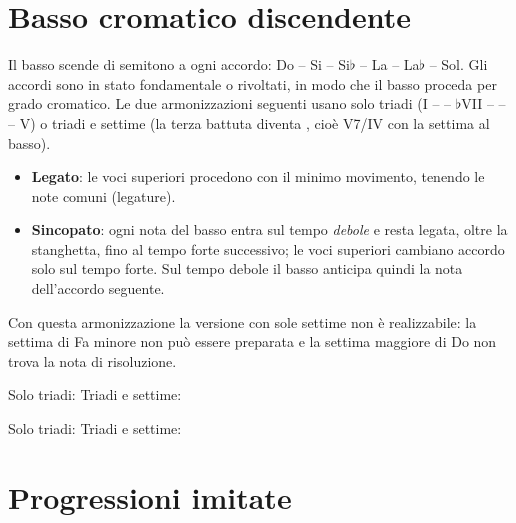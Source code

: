 \section{Basso cromatico discendente}
\label{sec:basso_cromatico_disc}

Il basso scende di semitono a ogni accordo: Do -- Si -- Si$\flat$ -- La -- La$\flat$ -- Sol. Gli accordi sono in stato fondamentale o rivoltati, in modo che il basso proceda per grado cromatico. Le due armonizzazioni seguenti usano solo triadi (I --  -- $\flat$VII --  --  -- V) o triadi e settime (la terza battuta diventa , cioè V7/IV con la settima al basso).

\begin{regola}
	\label{reg:cromatico_legato_sincopato}
	\begin{itemize}
		\item \textbf{Legato}: le voci superiori procedono con il minimo movimento, tenendo le note comuni (legature).
		\item \textbf{Sincopato}: ogni nota del basso entra sul tempo \emph{debole} e resta legata, oltre la stanghetta, fino al tempo forte successivo; le voci superiori cambiano accordo solo sul tempo forte. Sul tempo debole il basso anticipa quindi la nota dell'accordo seguente.
	\end{itemize}
	Con questa armonizzazione la versione con sole settime non è realizzabile: la settima di Fa minore non può essere preparata e la settima maggiore di Do non trova la nota di risoluzione.
\end{regola}

\begin{esempio}
	\label{ex:cromatico_legato}
	Solo triadi:
	Triadi e settime:
\end{esempio}

\begin{esempio}
	\label{ex:cromatico_sincopato}
	Solo triadi:
	Triadi e settime:
\end{esempio}

\section{Progressioni imitate}
\label{sec:progressioni_imitate}

